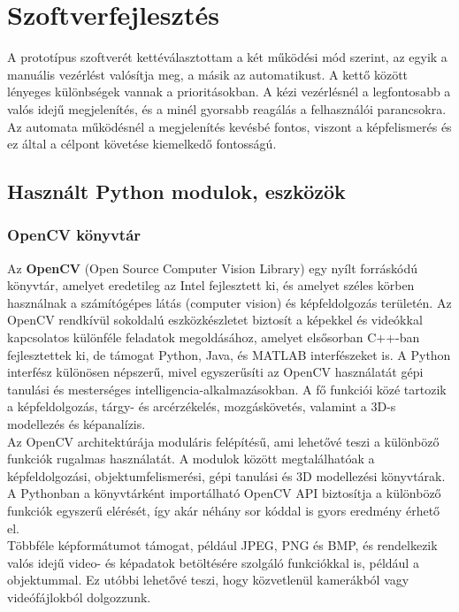 \documentclass[12pt,a4paper]{article}
\newcommand{\code}[1]{\tcbox{\texttt{#1}}}
\begin{document}
\pagebreak

\section{Szoftverfejlesztés}
A prototípus szoftverét kettéválasztottam a két működési mód szerint, az egyik a manuális vezérlést valósítja meg, a másik az automatikust. A kettő között lényeges különbségek vannak a prioritásokban. A kézi vezérlésnél a legfontosabb a valós idejű megjelenítés, és a minél gyorsabb reagálás a felhasználói parancsokra. Az automata működésnél a megjelenítés kevésbé fontos, viszont a képfelismerés és ez által a célpont követése kiemelkedő fontosságú.


\subsection{Használt Python modulok, eszközök}
\subsubsection*{OpenCV könyvtár}
Az \textbf{OpenCV} (Open Source Computer Vision Library) egy nyílt forráskódú könyvtár, amelyet eredetileg az Intel fejlesztett ki, és amelyet széles körben használnak a számítógépes látás (computer vision) és képfeldolgozás területén. Az OpenCV rendkívül sokoldalú eszközkészletet biztosít a képekkel és videókkal kapcsolatos különféle feladatok megoldásához, amelyet elsősorban C++-ban fejlesztettek ki, de támogat Python, Java, és MATLAB interfészeket is. A Python interfész különösen népszerű, mivel egyszerűsíti az OpenCV használatát gépi tanulási és mesterséges intelligencia-alkalmazásokban. A fő funkciói közé tartozik a képfeldolgozás, tárgy- és arcérzékelés, mozgáskövetés, valamint a 3D-s modellezés és képanalízis.\\

Az OpenCV architektúrája moduláris felépítésű, ami lehetővé teszi a különböző funkciók rugalmas használatát. A modulok között megtalálhatóak a képfeldolgozási, objektumfelismerési, gépi tanulási és 3D modellezési könyvtárak. A Pythonban a \code{cv2} könyvtárként importálható OpenCV API biztosítja a különböző funkciók egyszerű elérését, így akár néhány sor kóddal is gyors eredmény érhető el.\\

Többféle képformátumot támogat, például JPEG, PNG és BMP, és rendelkezik valós idejű video- és képadatok betöltésére szolgáló funkciókkal is, például a \code{VideoCapture} objektummal. Ez utóbbi lehetővé teszi, hogy közvetlenül kamerákból vagy videófájlokból dolgozzunk.\\
\end{document}
